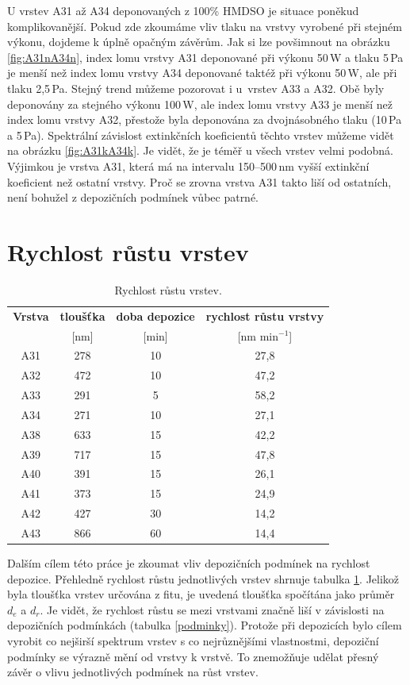 \documentclass[12pt,oneside,final]{fithesis2}
\begin{document}
U vrstev A31 až A34 deponovaných z 100\% HMDSO je situace poněkud komplikovanější. Pokud zde zkoumáme vliv tlaku na vrstvy vyrobené při stejném výkonu, dojdeme k úplně opačným závěrům. Jak si lze povšimnout na obrázku \ref{fig:A31nA34n}, index lomu vrstvy A31 deponované při výkonu 50\,W a tlaku 5\,Pa je menší než index lomu vrstvy A34 deponované taktéž při výkonu 50\,W, ale při tlaku 2,5\,Pa. Stejný trend můžeme pozorovat i u~vrstev A33 a A32. Obě byly deponovány za stejného výkonu 100\,W, ale index lomu vrstvy A33 je menší než index lomu vrstvy A32, přestože byla deponována za dvojnásobného tlaku (10\,Pa a 5\,Pa). Spektrální závislost extinkčních koeficientů těchto vrstev můžeme vidět na obrázku \ref{fig:A31kA34k}. Je vidět, že je téměř u všech vrstev velmi podobná. Výjimkou je vrstva A31, která má na intervalu 150--500\,nm vyšší extinkční koeficient než ostatní vrstvy. Proč se zrovna vrstva A31 takto liší od ostatních, není bohužel z depozičních podmínek vůbec patrné. 
 


\section{Rychlost růstu vrstev}

\begin{table}[b]
 \centering
 \begin{tabular}{|c|c|c|c|}
  \hline
  {\bf Vrstva} & {\bf tloušťka} & {\bf doba depozice} & {\bf rychlost růstu vrstvy} \\
  {}&{[nm]}&{[min]}&{[nm min$^{-1}$]}\\
   \hline \hline
   A31 & 278 & 10 & 27,8 \\
   A32 & 472 & 10 & 47,2 \\
   A33 & 291 & 5  & 58,2 \\
   A34 & 271 & 10 & 27,1 \\
   A38 & 633 & 15 & 42,2 \\
   A39 & 717 & 15 & 47,8 \\
   A40 & 391 & 15 & 26,1 \\
   A41 & 373 & 15 & 24,9 \\
   A42 & 427 & 30 & 14,2 \\
   A43 & 866 & 60 & 14,4 \\
  \hline
  \end{tabular}
  \caption{Rychlost růstu vrstev.}
  \label{rychlost}
\end{table}

Dalším cílem této práce je zkoumat vliv depozičních podmínek na rychlost depozice. Přehledně rychlost růstu jednotlivých vrstev shrnuje tabulka \ref{rychlost}. Jelikož byla tloušťka vrstev určována z fitu, je uvedená tloušťka spočítána jako průměr $d_e$ a $d_r$. Je vidět, že rychlost růstu se mezi vrstvami značně liší v závislosti na depozičních podmínkách (tabulka \ref{podminky}). Protože při depozicích bylo cílem vyrobit co nejširší spektrum vrstev s co nejrůznějšími vlastnostmi, depoziční podmínky se výrazně mění od vrstvy k vrstvě. To znemožňuje udělat přesný závěr o vlivu jednotlivých podmínek na růst vrstev. 
\end{document}

